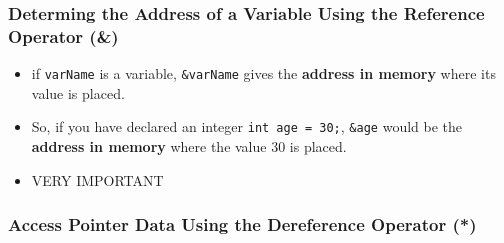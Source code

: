 \documentclass[10pt]{article}
\begin{document}
\newpage

\subsubsection{Determing the Address of a Variable Using the Reference Operator (\&)}
\begin{itemize}
	\item if \verb|varName| is a variable, \verb|&varName| gives the \textbf{address in memory} where its value is placed.

	\item So, if you have declared an integer \verb|int age = 30;|, \verb|&age| would be the \textbf{address in memory} where the value 30 is placed.

	\item {} VERY IMPORTANT
\end{itemize}

\newpage

\subsubsection{Access Pointer Data Using the Dereference Operator (*)}
\end{document}
